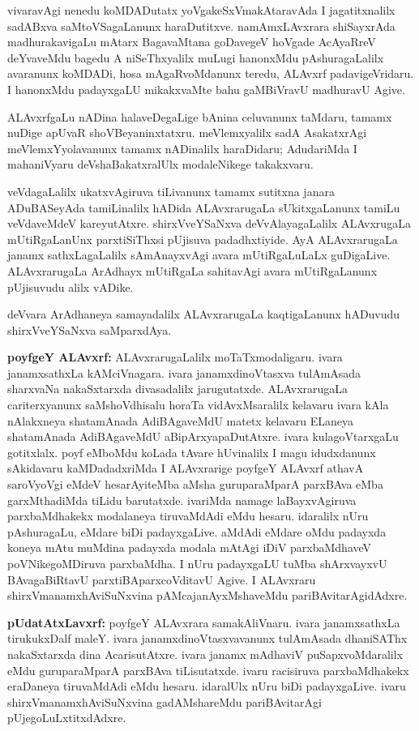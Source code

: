 vivaravAgi nenedu koMDADutatx yoVgakeSxVmakAtaravAda I jagatitxnalilx sadABxva saMtoVSagaLanunx haraDutitxve. namAmxLAvxrara shiSayxrAda madhurakavigaLu mAtarx BagavaMtana goDavegeV hoVgade AcAyaRreV deYvaveMdu bagedu A niSeThxyalilx muLugi hanonxMdu pAshuragaLalilx avaranunx koMDADi, hosa mAgaRvoMdanunx teredu, ALAvxrf padavigeVridaru. I hanonxMdu padayxgaLU mikakxvaMte bahu gaMBiVravU madhuravU Agive.

ALAvxrfgaLu nADina halaveDegaLige bAnina celuvanunx taMdaru, tamamx nuDige apUvaR shoVBeyaninxtatxru. meVlemxyalilx sadA AsakatxrAgi meVlemxYyolavanunx tamamx nADinalilx haraDidaru; AdudariMda I mahaniVyaru deVshaBakatxralUlx modaleNikege takakxvaru.

veVdagaLalilx ukatxvAgiruva tiLivanunx tamamx sutitxna janara ADuBASeyAda tamiLinalilx hADida ALAvxrarugaLa sUkitxgaLanunx tamiLu veVdaveMdeV kareyutAtxre. shirxVveYSaNxva deVvAlayagaLalilx ALAvxrugaLa mUtiRgaLanUnx parxtiSiThxsi pUjisuva padadhxtiyide. AyA ALAvxrarugaLa janamx sathxLagaLalilx sAmAnayxvAgi avara mUtiRgaLuLaLx guDigaLive. ALAvxrarugaLa ArAdhayx mUtiRgaLa sahitavAgi avara mUtiRgaLanunx pUjisuvudu alilx vADike.

deVvara ArAdhaneya samayadalilx ALAvxrarugaLa kaqtigaLanunx hADuvudu shirxVveYSaNxva saMparxdAya.

{\textbf {poyfgeY ALAvxrf:}} ALAvxrarugaLalilx moTaTxmodaligaru. ivara janamxsathxLa kAMciVnagara. ivara janamxdinoVtasxva tulAmAsada sharxvaNa nakaSxtarxda divasadalilx jarugutatxde. ALAvxrarugaLa cariterxyanunx saMshoVdhisalu horaTa vidAvxMsaralilx kelavaru ivara kAla nAlakxneya shatamAnada AdiBAgaveMdU matetx kelavaru ELaneya shatamAnada AdiBAgaveMdU aBipArxyapaDutAtxre. ivara kulagoVtarxgaLu gotitxlalx. poyf eMboMdu koLada tAvare hUvinalilx I magu idudxdanunx sAkidavaru kaMDadadxriMda I ALAvxrarige poyfgeY ALAvxrf athavA saroVyoVgi eMdeV hesarAyiteMba aMsha guruparaMparA parxBAva eMba garxMthadiMda tiLidu barutatxde. ivariMda namage laBayxvAgiruva parxbaMdhakekx modalaneya tiruvaMdAdi eMdu hesaru. idaralilx nUru pAshuragaLu, eMdare biDi padayxgaLive. aMdAdi eMdare oMdu padayxda koneya mAtu muMdina padayxda modala mAtAgi iDiV parxbaMdhaveV poVNikegoMDiruva parxbaMdha. I nUru padayxgaLU tuMba shArxvayxvU BAvagaBiRtavU parxtiBAparxcoVditavU Agive. I ALAvxraru shirxVmanamxhAviSuNxvina pAMcajanAyxMshaveMdu pariBAvitarAgidAdxre.

{\large\textbf {pUdatAtxLavxrf:}} poyfgeY ALAvxrara samakAliVnaru. ivara janamxsathxLa tirukukxDalf maleY. ivara janamxdinoVtasxvavanunx tulAmAsada dhaniSAThx nakaSxtarxda dina AcarisutAtxre. ivara janamx mAdhaviV puSapxvoMdaralilx eMdu guruparaMparA parxBAva tiLisutatxde. ivaru racisiruva parxbaMdhakekx eraDaneya tiruvaMdAdi eMdu hesaru. idaralUlx nUru biDi padayxgaLive. ivaru shirxVmanamxhAviSuNxvina gadAMshareMdu pariBAvitarAgi pUjegoLuLxtitxdAdxre.

